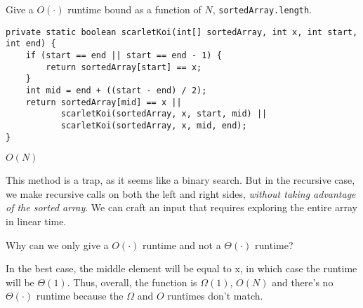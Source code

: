 \begin{blocksection}
\question Give a $O(\cdot)$ runtime bound as a function of $N$,
\lstinline$sortedArray.length$.
\begin{lstlisting}
private static boolean scarletKoi(int[] sortedArray, int x, int start, int end) {
    if (start == end || start == end - 1) {
        return sortedArray[start] == x;
    }
    int mid = end + ((start - end) / 2);
    return sortedArray[mid] == x ||
           scarletKoi(sortedArray, x, start, mid) ||
           scarletKoi(sortedArray, x, mid, end);
}
\end{lstlisting}

\begin{solution}
$O(N)$

This method is a trap, as it seems like a binary search. But in the recursive case, we make recursive calls on both the left and right sides, \textit{without taking advantage of the sorted array}. We can craft an input that requires exploring the entire array in linear time.
\end{solution}

Why can we only give a $O(\cdot)$ runtime and not a  $\Theta(\cdot)$ runtime?
\begin{solution}
In the best case, the middle element will be equal to x, in which case the runtime will be $\Theta(1)$. Thus, overall, the function is $\Omega(1)$, $O(N)$ and there's no $\Theta(\cdot)$ runtime because the $\Omega$ and $O$ runtimes don't match. 
\end{solution}

\end{blocksection}
